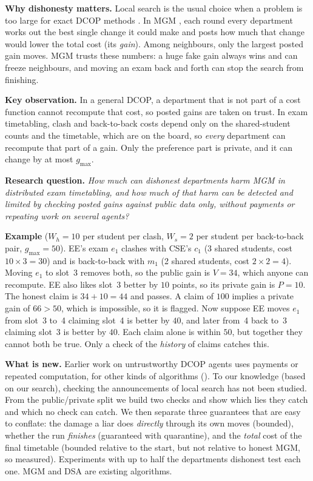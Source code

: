 \documentclass{article}
\theoremstyle{definition}
\newcommand{\1}{\mathbf{1}}
\newcommand{\gmax}{g_{\max}}
\begin{document}
\textbf{Why dishonesty matters.} Local search is the usual choice when a problem is too large for exact DCOP methods \citep{fioretto2018}. In MGM \citep{maheswaran2004mgm}, each round every department works out the best single change it could make and posts how much that change would lower the total cost (its \emph{gain}). Among neighbours, only the largest posted gain moves. MGM trusts these numbers: a huge fake gain always wins and can freeze neighbours, and moving an exam back and forth can stop the search from finishing.

\textbf{Key observation.} In a general DCOP, a department that is not part of a cost function cannot recompute that cost, so posted gains are taken on trust. In exam timetabling, clash and back-to-back costs depend only on the shared-student counts and the timetable, which are on the board, so \emph{every} department can recompute that part of a gain. Only the preference part is private, and it can change by at most $\gmax$.

\textbf{Research question.} \emph{How much can dishonest departments harm MGM in distributed exam timetabling, and how much of that harm can be detected and limited by checking posted gains against public data only, without payments or repeating work on several agents?}

\textbf{Example} ($W_h=10$ per student per clash, $W_s=2$ per student per back-to-back pair, $\gmax=50$). EE's exam $e_1$ clashes with CSE's $c_1$ (3 shared students, cost $10\times3=30$) and is back-to-back with $m_1$ (2 shared students, cost $2\times2=4$). Moving $e_1$ to slot~3 removes both, so the public gain is $V=34$, which anyone can recompute. EE also likes slot~3 better by $10$ points, so its private gain is $P=10$. The honest claim is $34+10=44$ and passes. A claim of $100$ implies a private gain of $66>50$, which is impossible, so it is flagged. Now suppose EE moves $e_1$ from slot~3 to~4 claiming slot~4 is better by $40$, and later from~4 back to~3 claiming slot~3 is better by $40$. Each claim alone is within $50$, but together they cannot both be true. Only a check of the \emph{history} of claims catches this.

\textbf{What is new.} Earlier work on untrustworthy DCOP agents uses payments or repeated computation, for other kinds of algorithms (). To our knowledge (based on our search), checking the announcements of local search has not been studied. From the public/private split we build two checks and show which lies they catch and which no check can catch. We then separate three guarantees that are easy to conflate: the damage a liar does \emph{directly} through its own moves (bounded), whether the run \emph{finishes} (guaranteed with quarantine), and the \emph{total} cost of the final timetable (bounded relative to the start, but not relative to honest MGM, so measured). Experiments with up to half the departments dishonest test each one. MGM and DSA are existing algorithms.
\end{document}
